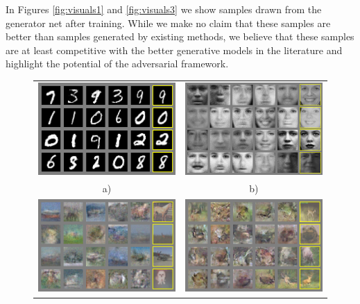\documentclass{article} %
\begin{document}
In Figures \ref{fig:visuals1} and \ref{fig:visuals3} we
show samples drawn from the generator net after training. 
While we make no claim that these samples are better than
samples generated by existing methods, we believe that these samples are at
least competitive with the better generative models in the literature and
highlight the potential of the adversarial framework.

\begin{figure}[h]
\centering
\begin{tabular}{cc}
 \includegraphics[width=2.6in]{mnist_samples.png} &
 \includegraphics[width=2.6in]{tfd_samples.png} \\
a) & b) \\
 \includegraphics[width=2.6in]{cifar_full_samples.png} &
 \includegraphics[width=2.6in]{cifar_conv_samples.png} \\

\end{tabular}
\end{figure}
\end{document}

